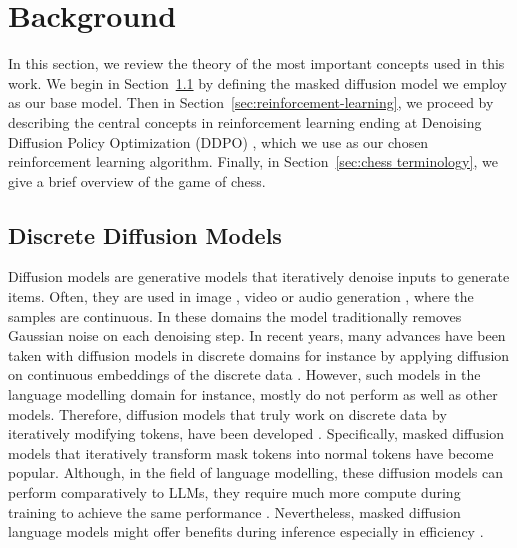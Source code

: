 \section{Background}
\label{sec:background}

In this section, we review the theory of the most important concepts used in this work. We begin in Section~\ref{sec:discrete diffusion} by defining the masked diffusion model we employ as our base model. Then in Section~\ref{sec:reinforcement-learning}, we proceed by describing the central concepts in reinforcement learning ending at Denoising Diffusion Policy Optimization (DDPO) \cite{black2024trainingdiffusionmodelsreinforcement}, which we use as our chosen reinforcement learning algorithm. Finally, in Section~\ref{sec:chess terminology}, we give a brief overview of the game of chess.

\subsection{Discrete Diffusion Models}
\label{sec:discrete diffusion}

Diffusion models are generative models that iteratively denoise inputs to generate items. Often, they are used in image \cite{rombach2022highresolutionimagesynthesis, saharia2022photorealistic}, video \cite{ho2022videodiffusionmodels, villegas2023phenaki} or audio generation \cite{chen2021wavegrad, kong2021diffwave}, where the samples are continuous. In these domains the model traditionally removes Gaussian noise on each denoising step. In recent years, many advances have been taken with diffusion models in discrete domains for instance by applying diffusion on continuous embeddings of the discrete data \cite{li2022diffusionlmimprovescontrollabletext, gulrajani2023likelihoodbaseddiffusionlanguagemodels, lovelace2023latentdifusionforlanguagegeneration}. However, such models in the language modelling domain for instance, mostly do not perform as well as other models. Therefore, diffusion models that truly work on discrete data by iteratively modifying tokens, have been developed \cite{austin2021structureddenoisingdiffusionmodels}. Specifically, masked diffusion models that iteratively transform mask tokens into normal tokens have become popular. Although, in the field of language modelling, these diffusion models can perform comparatively to LLMs, they require much more compute during training to achieve the same performance \cite{nie2025scalingmaskeddiffusionmodels}. Nevertheless, masked diffusion language models might offer benefits during inference especially in efficiency \cite{nie2025scalingmaskeddiffusionmodels}.

